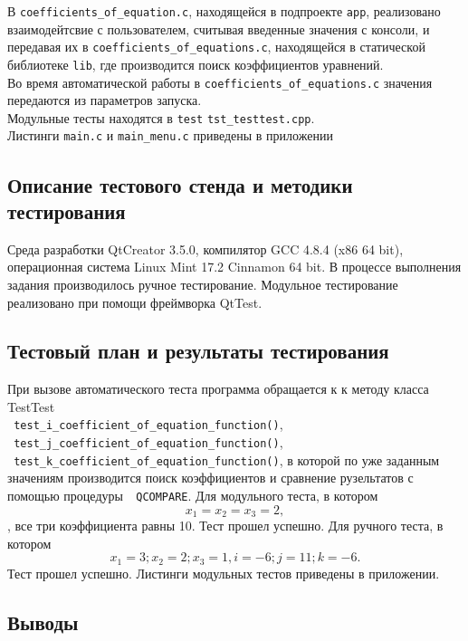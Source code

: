 \documentclass[12pt,a4paper]{report}
\begin{document}
В \verb+coefficients_of_equation.c+, находящейся в подпроекте \verb+app+,  реализовано взаимодейтсвие с пользователем, считывая введенные значения с консоли, и передавая их в \verb+coefficients_of_equations.c+, находящейся в статической библиотеке \verb+lib+, где производится поиск коэффициентов уравнений.\\
Во время автоматической работы в \verb+coefficients_of_equations.c+ значения передаются из параметров запуска.\\
Модульные тесты находятся в \verb+test+ \verb+tst_testtest.cpp+.\\
Листинги \verb+main.c+ и \verb+main_menu.c+ приведены в приложении
\subsection{Описание тестового стенда и методики тестирования}
Среда разработки QtCreator 3.5.0, компилятор GCC 4.8.4 (x86 64 bit), операционная система Linux Mint 17.2 Cinnamon 64 bit.
В процессе выполнения задания производилось ручное тестирование.
Модульное тестирование реализовано при помощи фреймворка QtTest.

\subsection{Тестовый план и результаты тестирования}
При вызове автоматического теста программа обращается к к методу класса TestTest\\ \verb+ test_i_coefficient_of_equation_function()+,\\
\verb+ test_j_coefficient_of_equation_function()+,\\
\verb+ test_k_coefficient_of_equation_function()+, в которой по уже заданным значениям производится поиск коэффициентов и сравнение рузельтатов с помощью процедуры\verb+  QCOMPARE+.
Для модульного теста, в котором 
\begin{equation}
x_1=x_2=x_3=2,
\end{equation}, все три коэффициента равны 10. Тест прошел успешно.
Для ручного теста, в котором \begin{equation}x_1=3; x_2=2; x_3=1, i=-6; j=11; k=-6.\end{equation} Тест прошел успешно.
Листинги модульных тестов приведены в приложении.

\subsection{Выводы}
\end{document}
